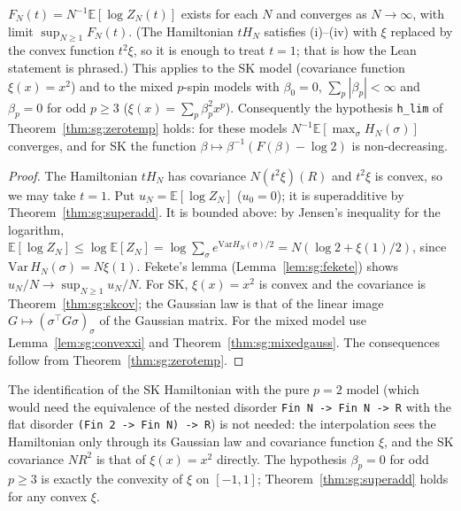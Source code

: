 \begin{theorem}
$F_N(t)=N^{-1}\mathbb E[\log Z_N(t)]$ exists for each $N$ and converges as $N\to\infty$, with limit $\sup_{N\ge1}F_N(t)$. (The Hamiltonian $tH_N$ satisfies (i)--(iv) with $\xi$ replaced by the convex function $t^2\xi$,
so it is enough to treat $t=1$; that is how the Lean statement is phrased.) This applies to the SK model
(covariance function $\xi(x)=x^2$) and to the mixed $p$-spin models with $\beta_0=0$, $\sum_p|\beta_p|<\infty$ and $\beta_p=0$ for odd
$p\ge3$ ($\xi(x)=\sum_p\beta_p^2x^p$). Consequently the hypothesis \texttt{h\_lim} of Theorem~\ref{thm:sg:zerotemp} holds: for these models
$N^{-1}\mathbb E[\max_\sigma H_N(\sigma)]$ converges, and for SK the function $\beta\mapsto\beta^{-1}(F(\beta)-\log2)$ is non-decreasing.
\end{theorem}

\begin{proof}
  \leanok
The Hamiltonian $tH_N$ has covariance $N(t^2\xi)(R)$ and $t^2\xi$ is convex, so we may take $t=1$. Put $u_N=\mathbb E[\log Z_N]$ ($u_0=0$); it is
superadditive by Theorem~\ref{thm:sg:superadd}. It is bounded above: by Jensen's inequality for the logarithm, $\mathbb E[\log Z_N]\le\log\mathbb E[Z_N]
=\log\sum_\sigma e^{\mathrm{Var}H_N(\sigma)/2}=N(\log2+\xi(1)/2)$, since $\mathrm{Var}\,H_N(\sigma)=N\xi(1)$. Fekete's lemma
(Lemma~\ref{lem:sg:fekete}) shows $u_N/N\to\sup_{N\ge1}u_N/N$. For SK, $\xi(x)=x^2$ is convex and the covariance is Theorem~\ref{thm:sg:skcov}; the
Gaussian law is that of the linear image $G\mapsto(\sigma^\top G\sigma)_\sigma$ of the Gaussian matrix. For the mixed model use
Lemma~\ref{lem:sg:convexxi} and Theorem~\ref{thm:sg:mixedgauss}. The consequences follow from Theorem~\ref{thm:sg:zerotemp}.
\end{proof}

\begin{remark}
The identification of the SK Hamiltonian with the pure $p=2$ model (which would need the equivalence of the nested disorder
\texttt{Fin N -> Fin N -> R} with the flat disorder \texttt{(Fin 2 -> Fin N) -> R}) is not needed: the interpolation sees the Hamiltonian only through
its Gaussian law and covariance function $\xi$, and the SK covariance $N R^2$ is that of $\xi(x)=x^2$ directly. The hypothesis $\beta_p=0$ for odd $p\ge3$
is exactly the convexity of $\xi$ on $[-1,1]$; Theorem~\ref{thm:sg:superadd} holds for any convex $\xi$.
\end{remark}

